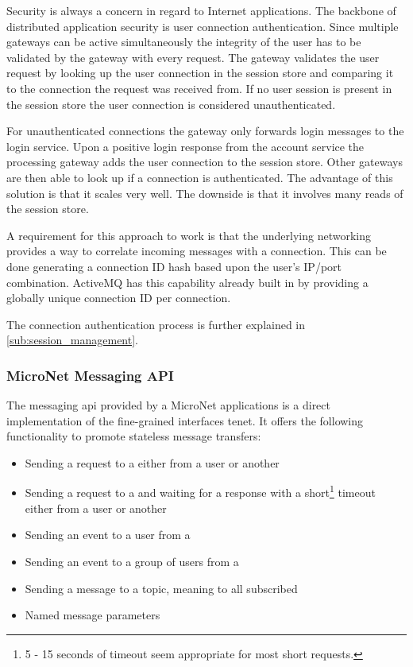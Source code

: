 Security is always a concern in regard to Internet applications. The backbone
of distributed application security is user connection authentication.
Since multiple gateways can be active simultaneously the integrity of the user
has to be validated by the gateway with every request. The gateway validates the
user request by looking up the user connection in the session store and
comparing it to the connection the request was received from. If no user session
is present in the session store the user connection is considered
unauthenticated.

For unauthenticated connections the gateway only forwards login messages to the
login service. Upon a positive login response from the account service the
processing gateway adds the user connection to the session store. Other gateways
are then able to look up if a connection is authenticated. The advantage of this
solution is that it scales very well. The downside is that it involves many
reads of the session store.

A requirement for this approach to work is that the underlying networking
provides a way to correlate incoming messages with a connection. This can be
done generating a connection ID hash based upon the user's IP/port combination.
ActiveMQ has this capability already built in by providing a globally unique
connection ID per connection.

The connection authentication process is further explained in
\autoref{sub:session_management}.

\subsubsection{MicroNet Messaging API}

The messaging \gls{api} provided by a MicroNet applications is a direct implementation
of the fine-grained interfaces tenet. It offers the following functionality to
promote stateless message transfers:

\begin{itemize}
  \item Sending a request to a \ms{} either from a user or another \ms{}
  \item Sending a request to a \ms{} and waiting for a response with a
  short\footnote{5 - 15 seconds of timeout seem appropriate for most short
  requests.} timeout either from a user or another \ms{}
  \item Sending an event to a user from a \ms{}
  \item Sending an event to a group of users from a \ms{}
  \item Sending a message to a topic, meaning to all subscribed \mss{}
  \item Named message parameters
\end{itemize}

